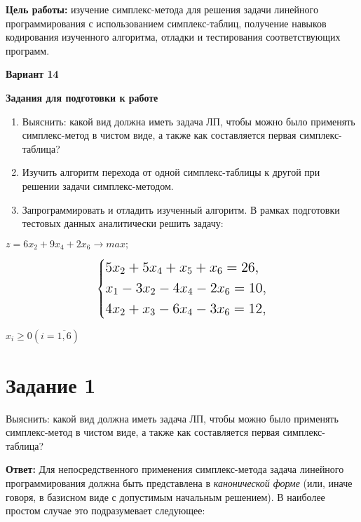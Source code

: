\documentclass{report}
\begin{document}
	\textbf{Цель работы:} изучение симплекс-метода для решения задачи
	линейного программирования с использованием симплекс-таблиц,
	получение навыков кодирования изученного алгоритма, отладки и
	тестирования соответствующих программ.
	\begin{center}
		\textbf{Вариант 14}
	\end{center}
		\begin{center}
		\textbf{Задания для подготовки к работе}
	\end{center}

	\begin{enumerate}
		\item{Выяснить: какой вид должна иметь задача ЛП, чтобы можно было
			применять симплекс-метод в чистом виде, а также как составляется
			первая симплекс-таблица?} 
		\item{Изучить алгоритм перехода от одной симплекс-таблицы к другой
			при решении задачи симплекс-методом.} 
		\item{Запрограммировать и отладить изученный алгоритм. В рамках
			подготовки тестовых данных аналитически решить задачу:}
	\end{enumerate}
	
	\begin{center}\Large
	$z = 6x_2 + 9x_4 + 2x_6 \rightarrow max;$
	\end{center}
	
	\[
	\Large\left\{
	\begin{aligned}
		&5x_2 + 5x_4 + x_5 + x_6 = 26, \\
		&x_1 - 3x_2 - 4x_4 - 2x_6 = 10, \\
		&4x_2 + x_3 - 6x_4 - 3x_6 = 12,
	\end{aligned}
	\right.
	\]
	
	\begin{center}\Large
	$x_i \geq 0 (i = \overline{1,6})$
	\end{center}
	
	
	\newpage
	
	\chapter{Задание 1}
	Выяснить: какой вид должна иметь задача ЛП, чтобы можно было
	применять симплекс-метод в чистом виде, а также как составляется
	первая симплекс-таблица?
	
	\textbf{Ответ:} Для непосредственного применения симплекс-метода задача линейного программирования должна быть представлена в \textit{канонической форме} (или, иначе говоря, в базисном виде с допустимым начальным решением). В наиболее простом случае это подразумевает следующее:
	
\end{document}
